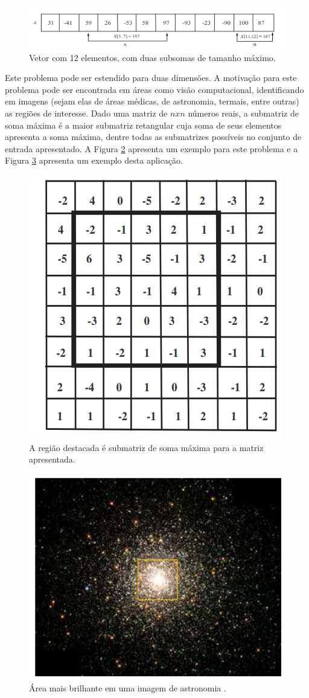 \documentclass[a4paper, 12pt] {article}
\begin{document}
\begin{figure}[ht]
\centering
\includegraphics[width=.8\textwidth]{maxsubsum.png}
\caption{Vetor com 12 elementos, com duas subsomas de tamanho máximo.}
\label{fig:maxsubsum}
\end{figure}

Este problema pode ser estendido para duas dimensões. A motivação para este problema pode ser
encontrada em áreas como visão computacional, identificando em imagens (sejam
elas de áreas médicas, de astronomia, termais, entre outras) as regiões de
interesse. Dado uma matriz de $nxn$
números reais, a submatriz de soma máxima é a maior submatriz retangular cuja
soma de seus elementos apresenta a soma máxima, dentre todas as submatrizes
possíveis no conjunto de entrada apresentado. A Figura \ref{fig:maxsubarray}
apresenta um exemplo para este problema e a Figura \ref{fig:brightest} apresenta
um exemplo desta aplicação.

\begin{figure}[ht]
\centering
\includegraphics[width=.35\textwidth]{maxsubarray.png}
\caption{A região destacada é submatriz de soma máxima para a matriz
apresentada.}
\label{fig:maxsubarray}
\end{figure}

\begin{figure}[ht]
\centering
\includegraphics[width=.4\textwidth]{brightest.png}
\caption{Área mais brilhante em uma imagem de astronomia \cite{bae2007}.}
\label{fig:brightest}
\end{figure}
\end{document}
